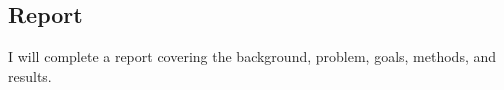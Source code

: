 \documentclass{article}
\begin{document}
\subsection{Report}
\label{pres}
I will complete a report covering the background, problem, goals, methods, and
results.



\end{document}
